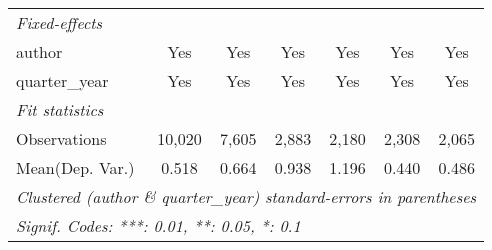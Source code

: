 \begin{tabular}{lcccccc}
   \midrule
   \emph{Fixed-effects}\\
   author                                & Yes           & Yes           & Yes           & Yes           & Yes           & Yes\\  
   quarter\_year                         & Yes           & Yes           & Yes           & Yes           & Yes           & Yes\\  
   \midrule
   \emph{Fit statistics}\\
   Observations                          & 10,020        & 7,605         & 2,883         & 2,180         & 2,308         & 2,065\\  
Mean(Dep. Var.) & 0.518 & 0.664 & 0.938 & 1.196 & 0.440 & 0.486 \\
   \midrule \midrule
   \multicolumn{7}{l}{\emph{Clustered (author \& quarter\_year) standard-errors in parentheses}}\\
   \multicolumn{7}{l}{\emph{Signif. Codes: ***: 0.01, **: 0.05, *: 0.1}}\\
\end{tabular}
\par\endgroup
